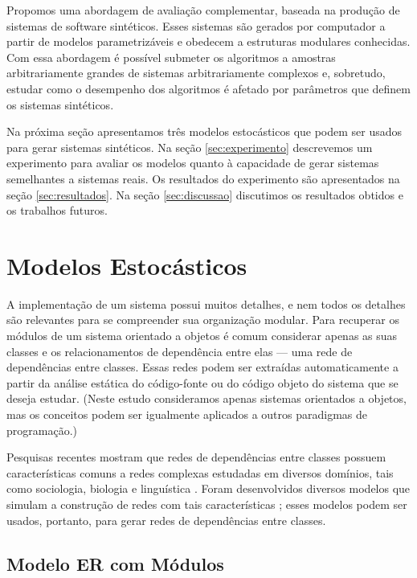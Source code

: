 \documentclass{acm_proc_article-sp}
\begin{document}
Propomos uma abordagem de avaliação complementar, baseada na produção de sistemas de software sintéticos. Esses sistemas são gerados por computador a partir de modelos parametrizáveis e obedecem a estruturas modulares conhecidas. Com essa abordagem é possível submeter os algoritmos a amostras arbitrariamente grandes de sistemas arbitrariamente complexos e, sobretudo, estudar como o desempenho dos algoritmos é afetado por parâmetros que definem os sistemas sintéticos.

Na próxima seção apresentamos três modelos estocásticos que podem ser usados para gerar sistemas sintéticos. Na seção \ref{sec:experimento} descrevemos um experimento para avaliar os modelos quanto à capacidade de gerar sistemas semelhantes a sistemas reais. Os resultados do experimento são apresentados na seção \ref{sec:resultados}. Na seção \ref{sec:discussao} discutimos  os resultados obtidos e os trabalhos futuros.

\section{Modelos Estocásticos} \label{sec:modelos}

A implementação de um sistema possui muitos detalhes, e nem todos os detalhes são relevantes para se compreender sua organização modular. Para recuperar os módulos de um sistema orientado a objetos é comum considerar apenas as suas classes e os relacionamentos de dependência entre elas --- uma rede de dependências entre classes. Essas redes podem ser extraídas automaticamente a partir da análise estática do código-fonte ou do código objeto do sistema que se deseja estudar. (Neste estudo consideramos apenas sistemas orientados a objetos, mas os conceitos podem ser igualmente aplicados a outros paradigmas de programação.)

Pesquisas recentes mostram que redes de dependências entre classes possuem características comuns a redes complexas estudadas em diversos domínios, tais como sociologia, biologia e linguística \cite{Myers2003,Valverde2003}. Foram desenvolvidos diversos modelos que simulam a construção de redes com tais características \cite{Bollobas2003,Lancichinetti2008}; esses modelos podem ser usados, portanto, para gerar redes de dependências entre classes. 

\subsection{Modelo ER com Módulos}
\end{document}
